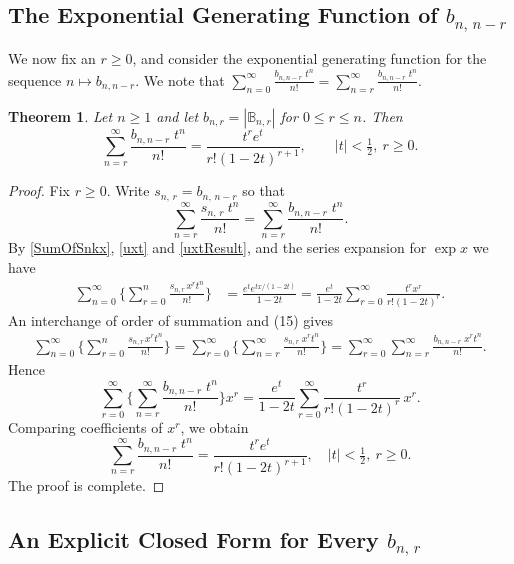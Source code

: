 \documentclass[11pt]{article}
\newtheorem{theorem}{Theorem}[section]
\newcommand{\q}{\quad}
\newcommand{\qq}{\qquad}
\newcommand{\ges}{\geqslant}
\newcommand{\les}{\leqslant}
\begin{document}
\subsection{The Exponential Generating Function of \(b_{n,\,n-r}\)}
We now fix an $r\ges 0$, and consider the exponential generating function for the sequence $n\mapsto b_{n,n-r}$. We note that $\sum\limits_{n=0}^\infty  \frac{b_{n,n-r\,}\,t^n}{n!}=\sum\limits_{n=r}^\infty  \frac{b_{n,n-r\,}\,t^n}{n!}$.
\begin{theorem}{\label{generatingBnr}}
Let $n\ges 1$ and let $b_{n,r}=|\mathbb B_{n,r}|$ for $0\les r\les n$. Then 
\[
\sum_{n=r}^\infty  \frac{b_{n,n-r\,}\,t^n}{n!}=\frac{t^re^t}{r!(1-2t)^{r+1}},\qq |t|<\tfrac12,~ r\ges 0.
\]
\end{theorem}
\begin{proof}
Fix $r\ges 0$.
Write $ s_{n,\,r}=b_{n,\,n-r}$ so that
\[\label{brt}
   \sum_{n=r}^\infty \frac{s_{n,\,r\,\,}t^n}{n!}
    = \sum_{n=r}^\infty \frac{ b_{n,n-r\,}\,t^n}{n!}.\tag{15}
\]
By \eqref{SumOfSnkx}, \eqref{uxt} and \eqref{uxtResult}, and the series expansion for $\exp x$ we have
\begin{align*}
\sum_{n=0}^\infty \Big\{\sum_{r=0}^n \frac{s_{n,r\,}x^rt^n}{n!}\Big\}&=\frac{e^te^{tx/(1-2t)}}{1-2t}
        =\frac{e^t}{1-2t} \sum_{r=0}^{\infty}\frac{t^rx^r}{r!(1-2t)^r}. \tag{16}
\end{align*}
An interchange of order of summation and (15) gives
\begin{align*}
\sum_{n=0}^\infty \Big\{\sum_{r=0}^n \frac{s_{n,r\,}x^rt^n}{n!}\Big\}
=\sum_{r=0}^\infty\Big\{ \sum_{n=r}^\infty\frac{s_{n,r\,\,}x^rt^n}{n!} \Big\}
=\sum_{r=0}^\infty\sum_{n=r}^\infty \frac{ b_{n,n-r\,}\,x^rt^n}{n!}.
\end{align*}
Hence
\[
\sum_{r=0}^\infty\Big\{\sum_{n=r}^\infty \frac{ b_{n,n-r\,}\,t^n}{n!}\Big\} x^r
=\frac{e^t}{1-2t} \sum_{r=0}^{\infty}\frac{t^r}{r!(1-2t)^r}\,x^r.
\]
Comparing coefficients of $x^r$, we obtain
\[ \label{snkGenerating}
    \sum_{n=r}^\infty  \frac{b_{n,n-r\,}\,t^n}{n!} = \frac{t^r e^t} {r!(1-2t)^{r+1}},\q |t|<\tfrac12,~ r\ge 0. \tag{17}
\]
The proof is complete.
\end{proof}


\subsection{An Explicit Closed Form for Every \(b_{n,\,r}\)}
\end{document}
